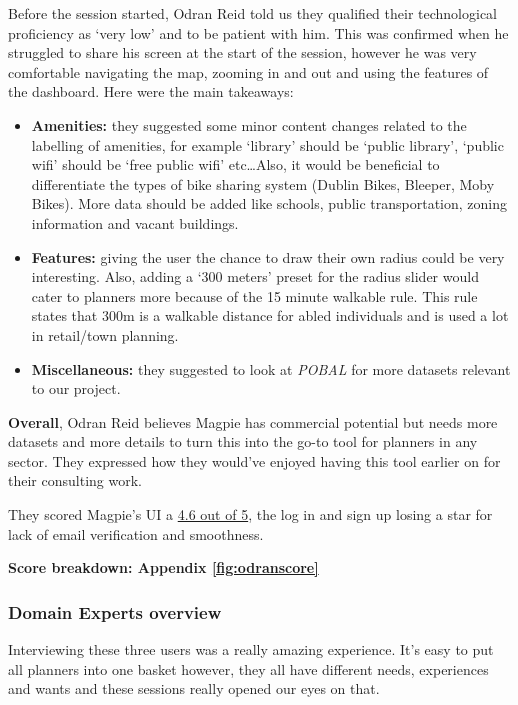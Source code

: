 Before the session started, Odran Reid told us they qualified their
technological proficiency as `very low' and to be patient with him. This was
confirmed when he struggled to share his screen at the start of the session,
however he was very comfortable navigating the map, zooming in and out and using
the features of the dashboard. Here were the main takeaways:
\begin{itemize}
    \item \textbf{Amenities:} they suggested some minor content changes related to the
          labelling of amenities, for example `library' should be `public library',
          `public wifi' should be `free public wifi' etc\ldots Also, it would be
          beneficial to differentiate the types of bike sharing system (Dublin Bikes,
          Bleeper, Moby Bikes). More data should be added like schools, public
          transportation, zoning information and vacant buildings.
          \vspace{0.2cm}
          
    \item \textbf{Features:} giving the user the chance to draw their own radius
          could be very interesting. Also, adding a `300 meters' preset for the radius
          slider would cater to planners more because of the 15 minute walkable
          rule. This rule states that 300m is a walkable distance for abled
          individuals and is used a lot in retail/town planning.
          \vspace{0.2cm}
          
    \item \textbf{Miscellaneous:} they suggested to look at \emph{POBAL} for
          more datasets relevant to our project.
          \vspace{0.2cm}
\end{itemize}
\textbf{Overall}, Odran Reid believes Magpie has commercial potential but needs
more datasets and more details to turn this into the go-to tool for planners in
any sector. They expressed how they would've enjoyed having this tool earlier on
for their consulting work.

They scored Magpie's UI a \underline{4.6 out of 5}, the log in and sign up
losing a star for lack of email verification and smoothness.

\hspace{2em}\textbf{Score breakdown: Appendix \ref{fig:odranscore}}

\newpage{}

\subsubsection{Domain Experts overview}
Interviewing these three users was a really amazing experience. It's easy to put
all planners into one basket however, they all have different needs, experiences
and wants and these sessions really opened our eyes on that.

